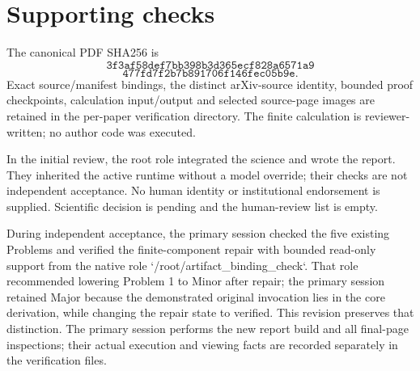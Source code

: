 \documentclass[10pt]{article}
\begin{document}
\section*{Supporting checks}
The canonical PDF SHA256 is \[\texttt{3f3af58def7bb398b3d365ecf828a6571a9}\] \[\texttt{477fd7f2b7b891706f146fec05b9e}.\] Exact source/manifest bindings, the distinct arXiv-source identity, bounded proof checkpoints, calculation input/output and selected source-page images are retained in the per-paper verification directory. The finite calculation is reviewer-written; no author code was executed.\par
In the initial review, the root role integrated the science and wrote the report. They inherited the active runtime without a model override; their checks are not independent acceptance. No human identity or institutional endorsement is supplied. Scientific decision is pending and the human-review list is empty.\par
During independent acceptance, the primary session checked the five existing Problems and verified the finite-component repair with bounded read-only support from the native role `/root/artifact\_binding\_check`. That role recommended lowering Problem 1 to Minor after repair; the primary session retained Major because the demonstrated original invocation lies in the core derivation, while changing the repair state to verified. This revision preserves that distinction. The primary session performs the new report build and all final-page inspections; their actual execution and viewing facts are recorded separately in the verification files.\par
\end{document}
